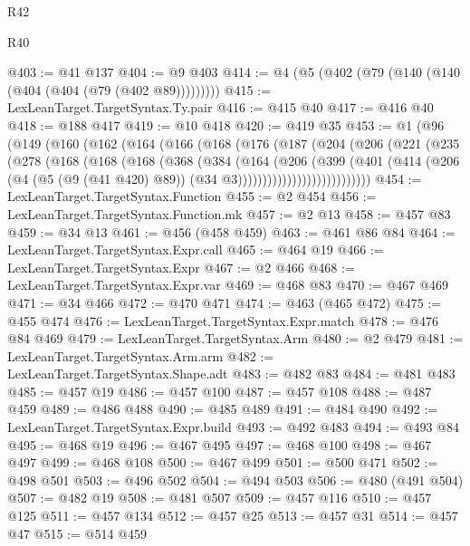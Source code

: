 \begin{lexlean}{R42}
\begin{lexlean}{R40}
\begin{coremodule}
{{{{{{{{{{{{{{{{{{{{{{{{{{{{{{{{{{{{{{{{{{{{{{{{{{{{{{{{{{{{{{{{{{{{{{{{{{{{{{{{{{{{{{{{{{{{{{{{{{{{{{{{{{{{{@403 := @41 @137
@404 := @9 @403
@414 := @4 (@5 (@402 (@79 (@140 (@140 (@404 (@404 (@79 (@402 @89)))))))))
@415 := LexLeanTarget.TargetSyntax.Ty.pair
@416 := @415 @40
@417 := @416 @40
@418 := @188 @417
@419 := @10 @418
@420 := @419 @35
@453 := @1
    (@96
      (@149
        (@160
          (@162
            (@164
              (@166
                (@168
                  (@176
                    (@187
                      (@204
                        (@206
                          (@221
                            (@235
                              (@278
                                (@168
                                  (@168
                                    (@168
                                      (@368
                                        (@384
                                          (@164
                                            (@206
                                              (@399
                                                (@401
                                                  (@414
                                                    (@206
                                                      (@4
                                                        (@5 (@9 (@41 @420) @89))
                                                        (@34 @3)))))))))))))))))))))))))))
@454 := LexLeanTarget.TargetSyntax.Function
@455 := @2 @454
@456 := LexLeanTarget.TargetSyntax.Function.mk
@457 := @2 @13
@458 := @457 @83
@459 := @34 @13
@461 := @456 (@458 @459)
@463 := @461 @86 @84
@464 := LexLeanTarget.TargetSyntax.Expr.call
@465 := @464 @19
@466 := LexLeanTarget.TargetSyntax.Expr
@467 := @2 @466
@468 := LexLeanTarget.TargetSyntax.Expr.var
@469 := @468 @83
@470 := @467 @469
@471 := @34 @466
@472 := @470 @471
@474 := @463 (@465 @472)
@475 := @455 @474
@476 := LexLeanTarget.TargetSyntax.Expr.match
@478 := @476 @84 @469
@479 := LexLeanTarget.TargetSyntax.Arm
@480 := @2 @479
@481 := LexLeanTarget.TargetSyntax.Arm.arm
@482 := LexLeanTarget.TargetSyntax.Shape.adt
@483 := @482 @83
@484 := @481 @483
@485 := @457 @19
@486 := @457 @100
@487 := @457 @108
@488 := @487 @459
@489 := @486 @488
@490 := @485 @489
@491 := @484 @490
@492 := LexLeanTarget.TargetSyntax.Expr.build
@493 := @492 @483
@494 := @493 @84
@495 := @468 @19
@496 := @467 @495
@497 := @468 @100
@498 := @467 @497
@499 := @468 @108
@500 := @467 @499
@501 := @500 @471
@502 := @498 @501
@503 := @496 @502
@504 := @494 @503
@506 := @480 (@491 @504)
@507 := @482 @19
@508 := @481 @507
@509 := @457 @116
@510 := @457 @125
@511 := @457 @134
@512 := @457 @25
@513 := @457 @31
@514 := @457 @47
@515 := @514 @459
}}}}}}}}}}}}}}}}}}}}}}}}}}}}}}}}}}}}}}}}}}}}}}}}}}}}}}}}}}}}}}}}}}}}}}}}}}}}}}}}}}}}}}}}}}}}}}}}}}}}}}}}}}}}}
\end{coremodule}
\end{lexlean}
\end{lexlean}
